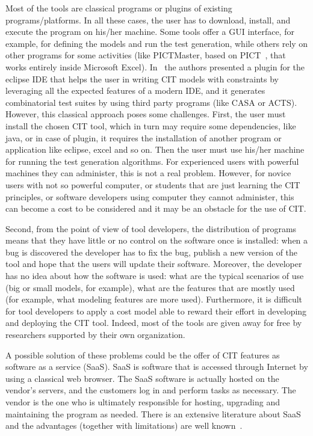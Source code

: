 \begin{tikzborder}{\cite{Gargantini16:validation}}
\begin{tikzborder}{\cite{gargantini_combinatorial_2017}}
\begin{tikzborder}{\cite{gargantini_combinatorial_2017}}
\begin{tikzborder}{\cite{garn2019}}
\begin{tikzborder}{\cite{arcaini2019achieving}}
Most of the tools are classical programs or plugins of existing programs/platforms.  In all these cases, the user has to download, install, and execute the program on his/her machine.  Some tools offer a GUI interface, for example, for defining the models and run the test generation, while others rely on other programs for some activities (like PICTMaster, based on PICT~\cite{czerwonka2006pairwise}, that works entirely inside Microsoft Excel). %
In~\cite{citlab12} the authors presented a plugin for the eclipse IDE that helps the user in writing CIT models with constraints by leveraging all the expected features of a modern IDE, and it generates combinatorial test suites by using third party programs (like CASA or ACTS).
However, this classical approach poses some challenges. First, the user must install the chosen CIT tool, which in turn may require some dependencies, like java, or in case of plugin, it requires the installation of another program or application like eclipse, excel and so on. Then the user must use his/her machine for running the test generation algorithms. For experienced users with powerful machines they can administer, this is not a real problem. However, for novice users with not so powerful computer, or students that are just learning the CIT principles, or software developers using computer they cannot administer, this can become a cost to be considered and it may be an obstacle for the use of CIT.

Second, from the point of view of tool developers, the distribution of programs means that they have little or no control on the software once is installed: when a bug is discovered the developer has to fix the bug, publish a new version of the tool and hope that the users will update their software. Moreover, the developer has no idea about how the software is used: what are the typical scenarios of use (big or small models, for example), what are the features that are mostly used (for example, what modeling features are more used). Furthermore, it is difficult for tool developers to apply a cost model able to reward their effort in developing and deploying the CIT tool. Indeed, most of the tools are given away for free by researchers supported by their own organization.

A possible solution of these problems could be the offer of CIT features as software as a service (SaaS). SaaS is software that is accessed through Internet by using a classical web browser.  The SaaS software is actually hosted on the vendor’s servers, and the customers log in and perform tasks as necessary.  The 
vendor is the one who is ultimately responsible for hosting, upgrading and maintaining the program as needed.  There is an extensive literature about SaaS and the advantages (together with limitations) are well known~\cite{Menken:2008}. 


\end{tikzborder}
\end{tikzborder}
\end{tikzborder}
\end{tikzborder}
\end{tikzborder}
